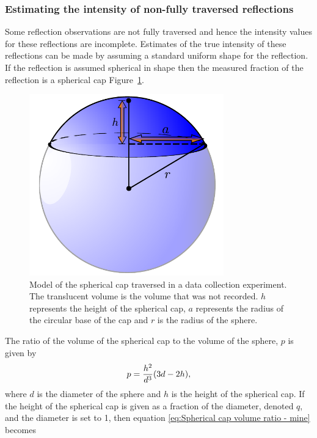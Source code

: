 \subsubsection{Estimating the intensity of non-fully traversed reflections}
\label{subs:Estimating the intensity of non-fully traversed reflections}
Some reflection observations are not fully traversed and hence the intensity values for these reflections are incomplete.
Estimates of the true intensity of these reflections can be made by assuming a standard uniform shape for the reflection.
If the reflection is assumed spherical in shape then the measured fraction of the reflection is a spherical cap Figure~\ref{fig:Spherical Cap}.
\begin{figure}[ht!]
    \centering
    \includegraphics[width=0.75\textwidth]{figures/datared/SphericalCap.pdf}
    \caption{Model of the spherical cap traversed in a data collection experiment.
    The translucent volume is the volume that was not recorded.
    $h$ represents the height of the spherical cap, $a$ represents the radius of the circular base of the cap and $r$ is the radius of the sphere.}
    \label{fig:Spherical Cap}
\end{figure}
The ratio of the volume of the spherical cap to the volume of the sphere, $p$ is given by
\begin{equation}
    p = \frac{h^2}{d^3} (3d - 2h),
    \label{eq:Spherical cap volume ratio - mine}
\end{equation}
where $d$ is the diameter of the sphere and $h$ is the height of the spherical cap.
If the height of the spherical cap is given as a fraction of the diameter, denoted $q$, and the diameter is set to 1, then equation \ref{eq:Spherical cap volume ratio - mine} becomes
